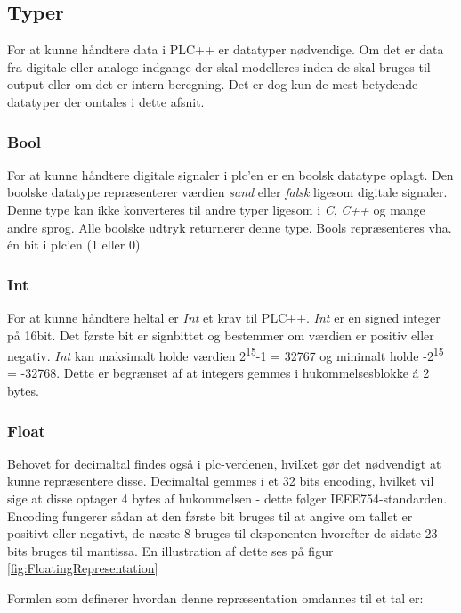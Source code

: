 \subsection{Typer}
For at kunne håndtere data i PLC++ er datatyper nødvendige. Om det er data fra digitale eller analoge indgange der skal modelleres inden de skal bruges til output eller om det er intern beregning. Det er dog kun de mest betydende datatyper der omtales i dette afsnit.

\subsubsection*{Bool}
For at kunne håndtere digitale signaler i \gls{plc}'en er en boolsk datatype oplagt. Den boolske datatype repræsenterer værdien \textit{sand} eller \textit{falsk} ligesom digitale signaler. Denne type kan ikke konverteres til andre typer ligesom i \textit{C}, \textit{C++} og mange andre sprog. Alle boolske udtryk returnerer denne type. Bools repræsenteres vha. én bit i \gls{plc}'en (1 eller 0). 

\subsubsection*{Int}
For at kunne håndtere heltal er \textit{Int} et krav til PLC++. \textit{Int} er en signed integer på 16bit. Det første bit er signbittet og bestemmer om værdien er positiv eller negativ. \textit{Int} kan maksimalt holde værdien 2\textsuperscript{15}-1 = 32767 og minimalt holde -2\textsuperscript{15} = -32768. Dette er begrænset af at integers gemmes i hukommelsesblokke á 2 bytes.

\subsubsection*{Float}
Behovet for decimaltal findes også i \gls{plc}-verdenen, hvilket gør det nødvendigt at kunne repræsentere disse. Decimaltal gemmes i et 32 bits encoding, hvilket vil sige at disse optager 4 bytes af hukommelsen - dette følger IEEE754-standarden. Encoding fungerer sådan at den første bit bruges til at angive om tallet er positivt eller negativt, de næste 8 bruges til eksponenten hvorefter de sidste 23 bits bruges til mantissa. En illustration af dette ses på figur \ref{fig:FloatingRepresentation}


Formlen som definerer hvordan denne repræsentation omdannes til et tal er:

